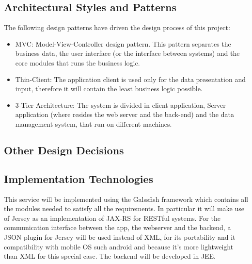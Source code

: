 \documentclass[11pt, a4paper,titlepage]{article}
\begin{document}
\subsection{Architectural Styles and Patterns}
	The following design patterns have driven the design process of this project:
	\begin{itemize}
		\item MVC: Model-View-Controller design pattern. This pattern separates the business data, the user interface (or the interface between systems) and the core modules that runs the business logic. 
		\item Thin-Client: The application client is used only for the data presentation and input, therefore it will contain the least business logic possible.
		\item 3-Tier Architecture: The system is divided in client application, Server application (where resides the web server and the back-end) and the data management system, that run on different machines.
	\end{itemize}
\subsection{Other Design Decisions}
\subsection{Implementation Technologies}
	This service will be implemented using the Galssfish framework which contains all the modules needed to satisfy all the requirements. In particular it will make use of Jersey as an implementation of JAX-RS for RESTful systems. For the communication interface between the app, the webserver and the backend, a JSON plugin for Jersey will be used instead of XML, for its portability and it compatibility with mobile OS such android and because it's more lightweight than XML for this special case. The backend will be developed in JEE.
\end{document}
